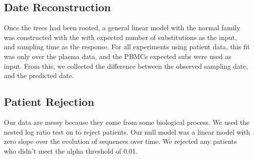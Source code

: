 \subsection{Date Reconstruction} \label{subsec:daterecon}
Once the trees had been rooted, a general linear model with the normal family was constructed with the with expected number of substitutions as the input, and sampling time as the response. For all experiments using patient data, this fit was only over the plasma data, and the PBMCs expected subs were used as input. From this, we collected the difference between the observed sampling date, and the predicted date. 

\subsection{Patient Rejection} \label{subsec:hypot}
Our data are messy because they come from some biological process. We used the nested log ratio test on to reject patients. Our null model was a linear model with zero slope over the evolution of sequences over time. We rejected any patients who didn’t meet the alpha threshold of 0.01.
